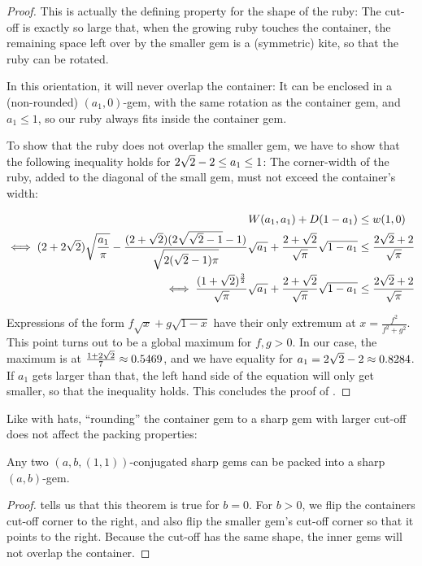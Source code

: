 \documentclass[a4paper,style=print,oneside,bibliography=totoc,nexus,lnum,extramargin]{tubsbook}
\begin{document}
\begin{proof}
    This is actually the defining property for the shape of the ruby: The cut-off is exactly so large that, when the growing ruby touches the container, the remaining space left over by the smaller gem is a (symmetric) kite, so that the ruby can be rotated.

    In this orientation, it will never overlap the container: It can be enclosed in a (non-rounded) $(a_1, 0)$-gem, with the same rotation as the container gem, and $a_1 \le 1$, so our ruby always fits inside the container gem.

    To show that the ruby does not overlap the smaller gem, we have to show that the following inequality holds for $2\sqrt{2}-2 \le a_1 \le 1$: The corner-width of the ruby, added to the diagonal of the small gem, must not exceed the container's width:

    \begin{align*}
        W(a_1,a_1) + D(1-a_1) &\le w(1,0)\\
        \iff (2+2\sqrt{2})\sqrt{\frac{a_1}{\pi}} - \frac{(2+\sqrt{2})(2\sqrt{\sqrt{2}-1}-1)}{\sqrt{2(\sqrt{2}-1)\pi}}\sqrt{a_1} + \frac{2+\sqrt{2}}{\sqrt{\pi}}\sqrt{1-a_1} &\le \frac{2\sqrt{2} + 2}{\sqrt{\pi}}\\
        \iff \frac{(1+\sqrt{2})^{\frac{3}{2}}}{\sqrt{\pi}}\sqrt{a_1} + \frac{2+\sqrt{2}}{\sqrt{\pi}}\sqrt{1-a_1} &\le \frac{2\sqrt{2} + 2}{\sqrt{\pi}}
    \end{align*}

    Expressions of the form $f\sqrt{x} + g\sqrt{1-x}$ have their only extremum at $x = \frac{f^2}{f^2+g^2}$. This point turns out to be a global maximum for $f,g > 0$. In our case, the maximum is at $\frac{1+2\sqrt{2}}{7} \approx 0.5469$, and we have equality for $a_1 = 2\sqrt{2}-2 \approx 0.8284$. If $a_1$ gets larger than that, the left hand side of the equation will only get smaller, so that the inequality holds. This concludes the proof of .
\end{proof}

Like with hats, “rounding” the container gem to a sharp gem with larger cut-off does not affect the packing properties:

\begin{lemma}\label{th:rounded-gems-in-gem}
    Any two $(a, b, (1,1))$-conjugated sharp gems can be packed into a sharp $(a,b)$-gem.
\end{lemma}

\begin{proof}
     tells us that this theorem is true for $b = 0$. 
    For $b > 0$, we flip the containers cut-off corner to the right, and also flip the smaller gem's cut-off corner so that it points to the right. Because the cut-off has the same shape, the inner gems will not overlap the container.
\end{proof}
\end{document}
